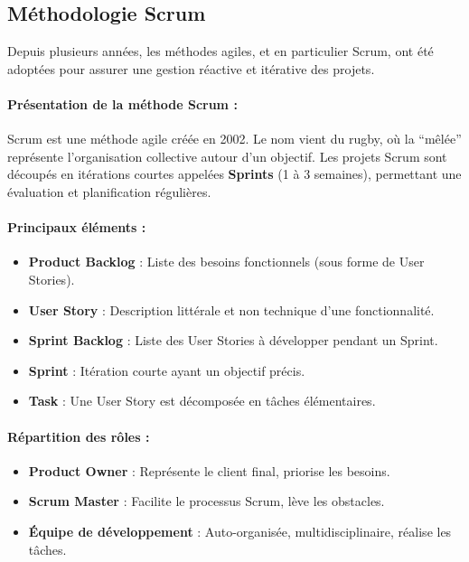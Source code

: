 \documentclass[12pt,a4paper]{report}
\begin{document}
\subsection{Méthodologie Scrum}

Depuis plusieurs années, les méthodes agiles, et en particulier Scrum, ont été adoptées pour assurer une gestion réactive et itérative des projets.

\paragraph{Présentation de la méthode Scrum :}

Scrum est une méthode agile créée en 2002. Le nom vient du rugby, où la “mêlée” représente l’organisation collective autour d’un objectif. Les projets Scrum sont découpés en itérations courtes appelées \textbf{Sprints} (1 à 3 semaines), permettant une évaluation et planification régulières.

\paragraph{Principaux éléments :}

\begin{itemize}
    \item \textbf{Product Backlog} : Liste des besoins fonctionnels (sous forme de User Stories).
    \item \textbf{User Story} : Description littérale et non technique d’une fonctionnalité.
    \item \textbf{Sprint Backlog} : Liste des User Stories à développer pendant un Sprint.
    \item \textbf{Sprint} : Itération courte ayant un objectif précis.
    \item \textbf{Task} : Une User Story est décomposée en tâches élémentaires.
\end{itemize}

\paragraph{Répartition des rôles :}

\begin{itemize}
    \item \textbf{Product Owner} : Représente le client final, priorise les besoins.
    \item \textbf{Scrum Master} : Facilite le processus Scrum, lève les obstacles.
    \item \textbf{Équipe de développement} : Auto-organisée, multidisciplinaire, réalise les tâches.
\end{itemize}
\end{document}
